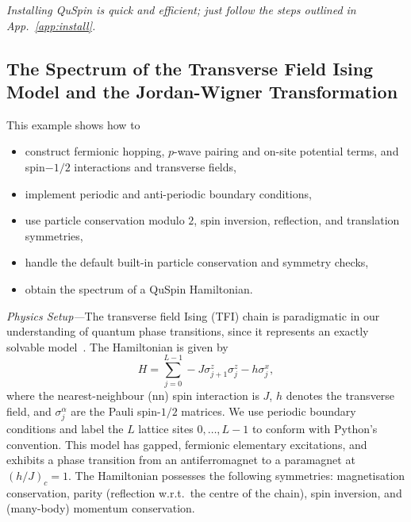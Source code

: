\documentclass{SciPost}
\newcommand\0{\scalebox{-1}[1]{0}}
\begin{document}
\emph{Installing QuSpin is quick and efficient; just follow the steps outlined in App.~\ref{app:install}.}


\subsection{The Spectrum of the Transverse Field Ising Model and the Jordan-Wigner Transformation}
\label{subsec:JW}

This example shows how to
\begin{itemize}
	\item construct fermionic hopping, $p$-wave pairing and on-site potential terms, and spin$-1/2$ interactions and transverse fields,
	\item implement periodic and anti-periodic boundary conditions,
	\item use particle conservation modulo $2$, spin inversion, reflection, and translation symmetries,
	\item handle the default built-in particle conservation and symmetry checks,
	\item obtain the spectrum of a QuSpin Hamiltonian.
\end{itemize}

\noindent\emph{Physics Setup---}The transverse field Ising (TFI) chain is paradigmatic in our understanding of quantum phase transitions, since it represents an exactly solvable model~\cite{sachdev_book}. The Hamiltonian is given by
\begin{equation}
H=\sum_{j=0}^{L-1}-J\sigma^z_{j+1}\sigma^z_j - h\sigma^x_j,
\label{eq:TFIM}
\end{equation} 
where the nearest-neighbour (nn) spin interaction is $J$, $h$ denotes the transverse field, and $\sigma^\alpha_j$ are the Pauli spin-$1/2$ matrices. We use periodic boundary conditions and label the $L$ lattice sites $0,\dots,L-1$ to conform with Python's convention. This model has gapped, fermionic elementary excitations, and exhibits a phase transition from an antiferromagnet to a paramagnet at $\left(h/J\right)_c=1$. The Hamiltonian possesses the following symmetries: magnetisation conservation, parity (reflection w.r.t.~the centre of the chain), spin inversion, and (many-body) momentum conservation.
\end{document}
